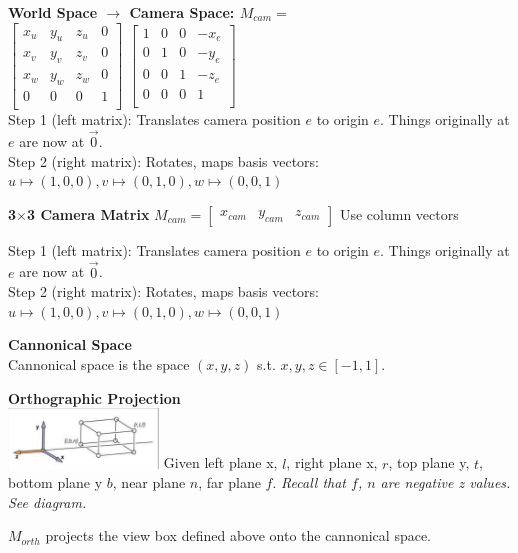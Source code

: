 \documentclass[letterpaper, 8pt]{extarticle}
\begin{document}
\begin{multicols*}{4}
\textbf{World Space $\to$ Camera Space: $M_{cam}=$}\\
\(
\begin{bmatrix}
    x_u & y_u & z_u & 0 \\
    x_v & y_v & z_v & 0 \\
    x_w & y_w & z_w & 0 \\
    0   & 0   & 0   & 1 \\
\end{bmatrix}
\)
\(
\begin{bmatrix}
    1 & 0 & 0 & -x_e \\
    0 & 1 & 0 & -y_e \\
    0 & 0 & 1 & -z_e \\
    0 & 0 & 0 & 1    \\
\end{bmatrix}
\)
\\
Step 1 (left matrix): Translates camera position $e$ to origin $e$. Things originally at $e$ are now at $\vec{0}$.\\
Step 2 (right matrix): Rotates, maps basis vectors: $u \mapsto (1,0,0), v \mapsto (0,1,0), w \mapsto (0,0,1)$

\textbf{3\(\times\)3 Camera Matrix}
\(
M_{cam}
= \begin{bmatrix}
    x_{cam} & y_{cam} & z_{cam}
\end{bmatrix}
\)
Use column vectors

Step 1 (left matrix): Translates camera position $e$ to origin $e$. Things originally at $e$ are now at $\vec{0}$.\\
Step 2 (right matrix): Rotates, maps basis vectors: $u \mapsto (1,0,0), v \mapsto (0,1,0), w \mapsto (0,0,1)$

\textbf{Cannonical Space}\\
Cannonical space is the space $(x, y, z)$ s.t. $x,y,z \in [-1, 1]$.

\textbf{Orthographic Projection}\\

\includegraphics[width=4cm]{cam-ortho.png}
Given left plane x, $l$, right plane x, $r$, top plane y, $t$, bottom plane y $b$, near plane $n$, far plane $f$.
\textit{Recall that $f$, $n$ are negative z values. See diagram.}

$M_{orth}$ projects the view box defined above onto the cannonical space.



\end{multicols*}
\end{document}
